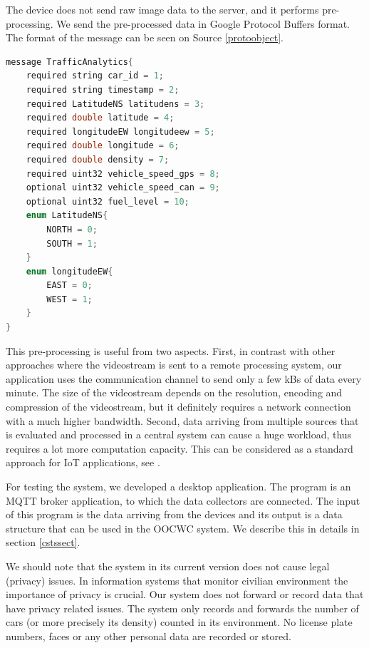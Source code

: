 \documentclass[b5paper,12pt]{report}
\theoremstyle{definition}
\begin{document}
The device does not send raw image data to the server, and it performs pre-processing. We send the pre-processed data in Google Protocol Buffers format. The format of the message can be seen on Source \ref{protoobject}.

\begin{lstlisting}[language=C,caption=Protocol Buffers message format., label=protoobject]
message TrafficAnalytics{
    required string car_id = 1;
    required string timestamp = 2;
    required LatitudeNS latitudens = 3;
    required double latitude = 4;
    required longitudeEW longitudeew = 5;
    required double longitude = 6;
    required double density = 7;
    required uint32 vehicle_speed_gps = 8;
    optional uint32 vehicle_speed_can = 9;
    optional uint32 fuel_level = 10;
    enum LatitudeNS{
        NORTH = 0;
        SOUTH = 1;
    }
    enum longitudeEW{
        EAST = 0;
        WEST = 1;
    }
}
\end{lstlisting}

This pre-processing is useful from two aspects. First, in contrast with other approaches where the videostream is sent to a remote processing system, our application uses the communication channel to send only a few kBs of data every minute. The size of the videostream depends on the resolution, encoding and compression of the videostream, but it definitely requires a network connection with a much higher bandwidth. Second, data arriving from multiple sources that is evaluated and processed in a central system can cause a huge workload, thus requires a lot more computation capacity. This can be considered as a standard approach for IoT applications, see \cite{rayes2017internet}.

For testing the system, we developed a desktop application. The program is an MQTT broker application, to which the data collectors are connected. The input of this program is the data arriving from the devices and its output is a data structure that can be used in the OOCWC system. We describe this in details in section \ref{cstssect}.

We should note that the system in its current version does not cause legal (privacy) issues. In information systems that monitor civilian environment the importance of privacy is crucial. Our system does not forward or record data that have privacy related issues. The system only records and forwards the number of cars (or more precisely its density) counted in its environment. No license plate numbers, faces or any other personal data are recorded or stored.
\end{document}
